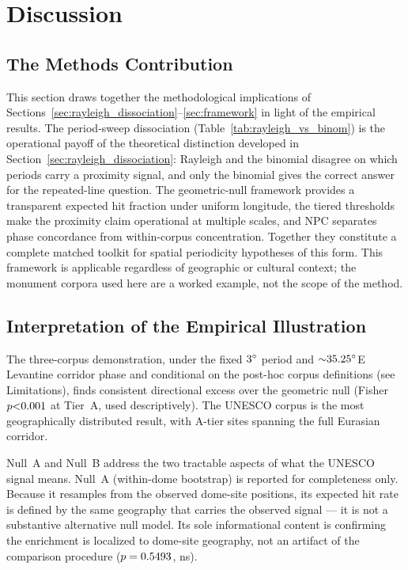 \documentclass[12pt,a4paper]{article}
\newcommand{\degr}{\ifmmode^\circ\else\textdegree{}\fi}
\begin{document}
\FloatBarrier
\section{Discussion}
\label{sec:discussion}

\subsection{The Methods Contribution}

This section draws together the methodological implications of
Sections~\ref{sec:rayleigh_dissociation}--\ref{sec:framework} in light of
the empirical results. The period-sweep dissociation (Table~\ref{tab:rayleigh_vs_binom}) is
the operational payoff of the theoretical distinction developed in
Section~\ref{sec:rayleigh_dissociation}: Rayleigh and the binomial disagree
on which periods carry a proximity signal, and only the binomial gives
the correct answer for the repeated-line question. The geometric-null
framework provides a transparent expected hit fraction under uniform
longitude, the tiered thresholds make the proximity claim operational
at multiple scales, and NPC separates phase concordance from within-corpus
concentration. Together they constitute a complete matched toolkit
for spatial periodicity hypotheses of this form.
This framework is applicable regardless of geographic or cultural
context; the monument corpora used here are a worked example, not the
scope of the method.

\subsection{Interpretation of the Empirical Illustration}

The three-corpus demonstration, under the fixed $3\degr$ period and
${\sim}35.25\degr$E Levantine corridor phase and conditional on the
post-hoc corpus definitions (see Limitations), finds consistent
directional excess over the geometric null
(Fisher $p {<}0.001{}$ at Tier~A, used descriptively).
The UNESCO corpus is
the most geographically distributed result, with A-tier sites spanning the full
Eurasian corridor.

Null~A and Null~B address the two tractable aspects of what the UNESCO
signal means. Null~A (within-dome bootstrap) is reported for
completeness only. Because it resamples from the observed dome-site
positions, its expected hit rate is defined by the same geography that
carries the observed signal --- it is not a substantive alternative null
model. Its sole informational content is confirming the enrichment is
localized to dome-site geography, not an artifact of the comparison
procedure ($p = 0.5493{}$, ns).
\end{document}
